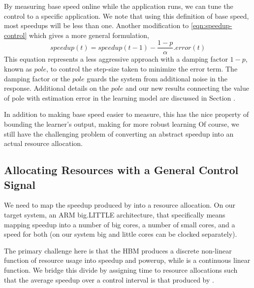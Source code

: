 By measuring
base speed online while the application runs, we can tune the control
to a specific application.  We note that using this definition of base
speed, most speedups will be less than one.  Another modification to \eqref{eqn:speedup-control} which gives a more general formulation,
\begin{equation}
speedup(t) = speedup(t-1) - \frac{1 - p}{\alpha}.error(t)
\end{equation}
This equation represents a less aggressive approach with a damping factor $1-p$, known as $pole$, to control the step-size taken to minimize the error term. The damping factor or the $pole$ guards the system from additional noise in the response. Additional details on the $pole$ and our new results connecting the value of pole with estimation error in the learning model are discussed in Section \secref{}.

In addition to making
base speed easier to measure, this has the nice property of bounding
the learner's output, making for more robust learning 
Of course, we still have the challenging problem of converting an
abstract speedup into an actual resource allocation.


\subsection{Allocating Resources with a General Control Signal}
We need to map the speedup produced by  into a
resource allocation.  On our target system, an ARM big.LITTLE
architecture, that specifically means mapping speedup into a number of
big cores, a number of small cores, and a speed for both (on our
system big and little cores can be clocked separately).

The primary challenge here is that the HBM produces a discrete
non-linear function of resource usage into speedup and powerup, while
 is a continuous linear function.  We bridge
this divide by assigning time to resource allocations such that the
average speedup over a control interval is that produced by
.

